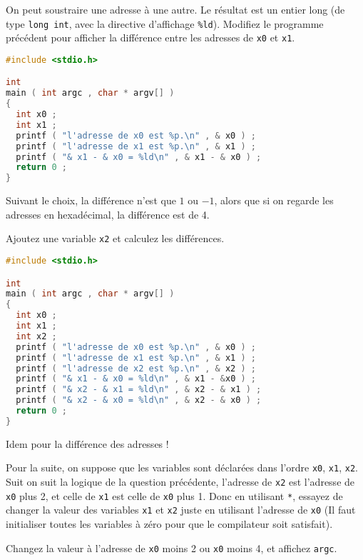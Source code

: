 \question On peut soustraire une adresse à une autre. Le résultat est
un entier long (de type \texttt{long int}, avec la directive
d'affichage \texttt{\%ld}). Modifiez le programme précédent pour
afficher la différence entre les adresses de \texttt{x0} et
\texttt{x1}.

\begin{solution}
  \begin{lstlisting}[language=C]
#include <stdio.h>

int
main ( int argc , char * argv[] )
{
  int x0 ;
  int x1 ;
  printf ( "l'adresse de x0 est %p.\n" , & x0 ) ;
  printf ( "l'adresse de x1 est %p.\n" , & x1 ) ;
  printf ( "& x1 - & x0 = %ld\n" , & x1 - & x0 ) ;
  return 0 ;
}
  \end{lstlisting}

  Suivant le choix, la différence n'est que \(1\) ou \(-1\), alors que si on
  regarde les adresses en hexadécimal, la différence est de 4.
\end{solution}

\question Ajoutez une variable \texttt{x2} et calculez les différences.


\begin{solution}
  \begin{lstlisting}[language=C]
#include <stdio.h>

int
main ( int argc , char * argv[] )
{
  int x0 ;
  int x1 ;
  int x2 ;
  printf ( "l'adresse de x0 est %p.\n" , & x0 ) ;
  printf ( "l'adresse de x1 est %p.\n" , & x1 ) ;
  printf ( "l'adresse de x2 est %p.\n" , & x2 ) ;
  printf ( "& x1 - & x0 = %ld\n" , & x1 - &x0 ) ;
  printf ( "& x2 - & x1 = %ld\n" , & x2 - & x1 ) ;
  printf ( "& x2 - & x0 = %ld\n" , & x2 - & x0 ) ;
  return 0 ;
}
  \end{lstlisting}
  Idem pour la différence des adresses !
\end{solution}

\question Pour la suite, on suppose que les variables sont déclarées
dans l'ordre \texttt{x0}, \texttt{x1}, \texttt{x2}. Suit on suit la
logique de la question précédente, l'adresse de \texttt{x2} est
l'adresse de \texttt{x0} plus 2, et celle de \texttt{x1} est celle de
\texttt{x0} plus 1. Donc en utilisant \texttt{*}, essayez de changer la
valeur des variables \texttt{x1} et \texttt{x2} juste en utilisant
l'adresse de \texttt{x0} (Il faut initialiser toutes les variables à
zéro pour que le compilateur soit satisfait).

\question Changez la valeur à l'adresse de \texttt{x0} moins 2 ou
\texttt{x0} moins 4, et affichez \texttt{argc}.

